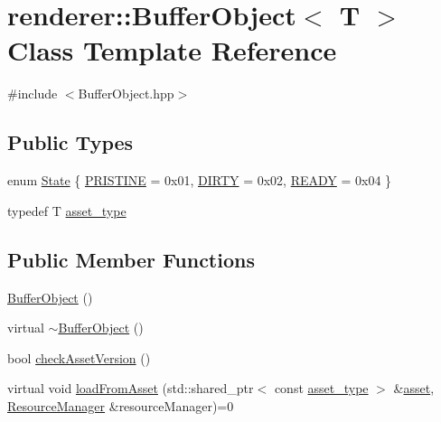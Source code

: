 \hypertarget{classrenderer_1_1BufferObject}{\section{renderer\-:\-:Buffer\-Object$<$ T $>$ Class Template Reference}
\label{classrenderer_1_1BufferObject}
}


{\ttfamily \#include $<$Buffer\-Object.\-hpp$>$}

\subsection*{Public Types}
\begin{DoxyCompactItemize}
\item 
enum \hyperlink{classrenderer_1_1BufferObject_a74481806c1554a39dfe43566f6e1ea11}{State} \{ \hyperlink{classrenderer_1_1BufferObject_a74481806c1554a39dfe43566f6e1ea11ae2b1be1545307fdc1cc166c355254ac9}{P\-R\-I\-S\-T\-I\-N\-E} = 0x01, 
\hyperlink{classrenderer_1_1BufferObject_a74481806c1554a39dfe43566f6e1ea11a3ee8356afc3ba1cd4e52dc6a5aa5caa5}{D\-I\-R\-T\-Y} = 0x02, 
\hyperlink{classrenderer_1_1BufferObject_a74481806c1554a39dfe43566f6e1ea11a76e09bb137cf1dedef5e5b8509155cba}{R\-E\-A\-D\-Y} = 0x04
 \}
\item 
typedef T \hyperlink{classrenderer_1_1BufferObject_a651cbaff8aa7148d72a9eaf71ad3636e}{asset\-\_\-type}
\end{DoxyCompactItemize}
\subsection*{Public Member Functions}
\begin{DoxyCompactItemize}
\item 
\hyperlink{classrenderer_1_1BufferObject_a3402bdd4e3d5e0a60a7df55dad5b726e}{Buffer\-Object} ()
\item 
virtual \hyperlink{classrenderer_1_1BufferObject_a00104dccf47c9f9b33ecfc2faa6a7c90}{$\sim$\-Buffer\-Object} ()
\item 
bool \hyperlink{classrenderer_1_1BufferObject_a14e522660f3e93573cc251c1eeb0f66e}{check\-Asset\-Version} ()
\item 
virtual void \hyperlink{classrenderer_1_1BufferObject_a8a73309dca661d6bf4785efc3e45db92}{load\-From\-Asset} (std\-::shared\-\_\-ptr$<$ const \hyperlink{classrenderer_1_1BufferObject_a651cbaff8aa7148d72a9eaf71ad3636e}{asset\-\_\-type} $>$ \&\hyperlink{classrenderer_1_1BufferObject_ad747c7e09a4acda6847b6fca9977eed6}{asset}, \hyperlink{classrenderer_1_1ResourceManager}{Resource\-Manager} \&resource\-Manager)=0
\end{DoxyCompactItemize}
